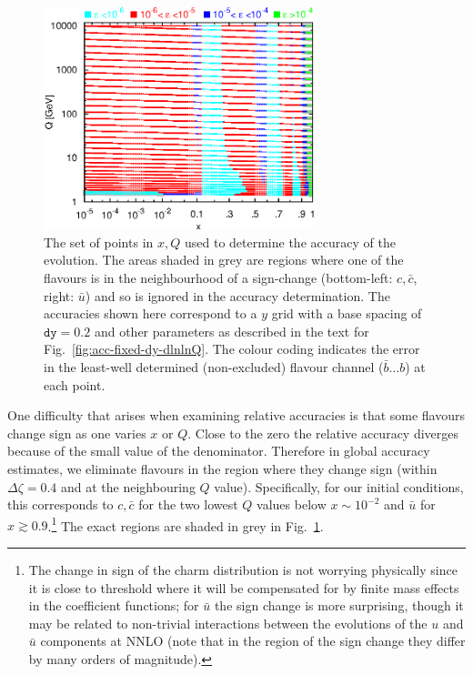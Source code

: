 \documentclass[12pt]{article}
\newcommand{\comment}[1]{\textbf{[#1]}}
\newcommand{\ttt}[1]{\texttt{#1}}
\begin{document}
\begin{figure}
  \centering
  \includegraphics[width=0.7\textwidth]{../benchmarking/test_acc/grid.eps}%
  \caption{The set of points in $x, Q$ used to determine the accuracy
    of the evolution. The areas shaded in grey are regions where one
    of the flavours is in the neighbourhood of a sign-change
    (bottom-left: $c,\bar c$, right: $\bar u$) and so is ignored in
    the accuracy determination.  The accuracies shown here correspond
    to a $y$ grid with a base spacing of $\ttt{dy}=0.2$ and other
    parameters as described in the text for
    Fig.~\ref{fig:acc-fixed-dy-dlnlnQ}.
    The colour coding indicates the error in the least-well determined
    (non-excluded) flavour channel ($\bar b \ldots b$) at each point.
  }
  \label{fig:grid}
\end{figure}


One difficulty that arises when examining relative accuracies is that
some flavours change sign as one varies $x$ or $Q$. Close to the zero
the relative accuracy diverges because of the small value of the
denominator. Therefore in global accuracy estimates, we eliminate
flavours in the region where they change sign (within $\Delta
\zeta=0.4$ and at the neighbouring $Q$ value). Specifically, for our
initial conditions, this corresponds to $c,\bar c$ for the two lowest
$Q$ values below $x\sim 10^{-2}$ and $\bar u$ for $x\gtrsim
0.9$.\footnote{The change in sign of the charm distribution is not
  worrying physically since it is close to threshold where it will be
  compensated for by finite mass effects in the coefficient functions;
  for $\bar u$ the sign change is more surprising, though it may be
  related to non-trivial interactions between the evolutions of the
  $u$ and $\bar u$ components at NNLO (note that in the region of the
  sign change they differ by many orders of magnitude).  } %
The exact regions are shaded in grey in Fig.~\ref{fig:grid}.
\end{document}
